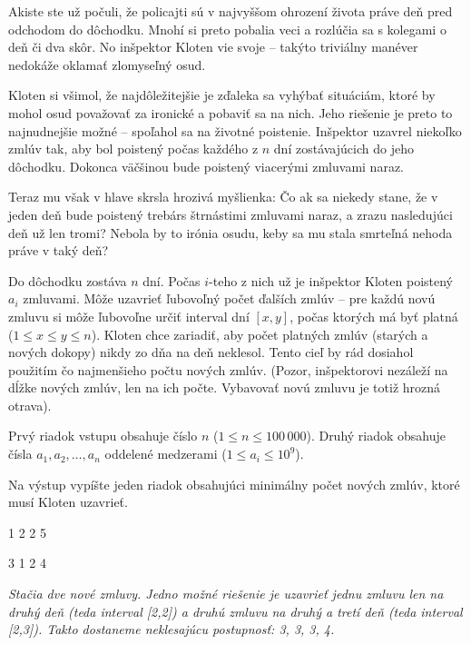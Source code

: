 




Akiste ste už počuli, že policajti sú v najvyššom ohrození života práve deň pred
odchodom do dôchodku. Mnohí si preto pobalia veci a rozlúčia sa s kolegami o deň
či dva skôr. No inšpektor Kloten vie svoje -- takýto triviálny manéver nedokáže
oklamať zlomyseľný osud.

Kloten si všimol, že najdôležitejšie je zďaleka sa vyhýbať situáciám, ktoré by
mohol osud považovať za ironické a pobaviť sa na nich. Jeho riešenie je preto to
najnudnejšie možné -- spoľahol sa na životné poistenie. Inšpektor uzavrel
niekoľko zmlúv tak, aby bol poistený počas každého z $n$ dní zostávajúcich do
jeho dôchodku. Dokonca väčšinou bude poistený viacerými zmluvami naraz.

Teraz mu však v hlave skrsla hrozivá myšlienka: Čo ak sa niekedy stane, že
v jeden deň bude poistený trebárs štrnástimi zmluvami naraz, a zrazu nasledujúci deň
už len tromi?
Nebola by to irónia osudu, keby sa mu stala smrteľná nehoda práve v taký deň?%



Do dôchodku zostáva $n$ dní. Počas $i$-teho z nich už je inšpektor Kloten poistený
$a_i$ zmluvami. Môže uzavrieť ľubovoľný počet ďalších zmlúv -- pre každú novú
zmluvu si môže ľubovoľne určiť interval dní $[x, y]$, počas ktorých má byť platná ($1 \leq x \leq y
\leq n$). Kloten chce zariadiť, aby počet platných zmlúv (starých a nových dokopy)
nikdy zo dňa na deň neklesol. Tento cieľ by rád dosiahol použitím čo
najmenšieho počtu nových zmlúv. (Pozor, inšpektorovi nezáleží na dĺžke nových
zmlúv, len na ich počte. Vybavovať novú zmluvu je totiž hrozná otrava).


Prvý riadok vstupu obsahuje číslo $n$ ($1 \leq n \leq 100\,000$). Druhý riadok
obsahuje čísla $a_1, a_2, \dots, a_n$ oddelené medzerami ($1 \leq a_i \leq
10^9$).


Na výstup vypíšte jeden riadok obsahujúci minimálny počet nových zmlúv, ktoré
musí Kloten uzavrieť.



1 2 2 5
\koniec

3 1 2 4
\koniec

{\sl
Stačia dve nové zmluvy.
Jedno možné riešenie je uzavrieť jednu zmluvu len na druhý deň (teda interval [2,2]) a druhú zmluvu
na druhý a tretí deň (teda interval [2,3]).
Takto dostaneme neklesajúcu postupnosť: 3, 3, 3, 4.
}



